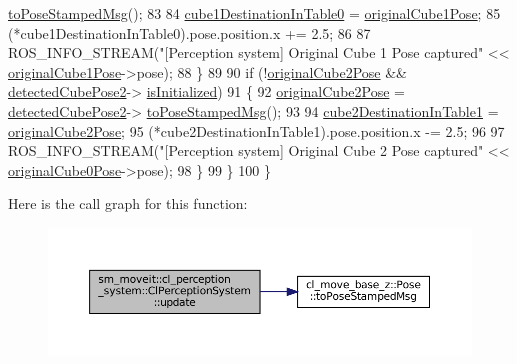 \begin{DoxyCode}
      \hyperlink{classcl__move__base__z_1_1Pose_a63887a88c1ac6e9a4a71b8d7d11aed6c}{toPoseStampedMsg}();
83 
84                 \hyperlink{classsm__moveit_1_1cl__perception__system_1_1ClPerceptionSystem_a13cf34b1fb711829c4ddb9a9e2899ae9}{cube1DestinationInTable0} = 
      \hyperlink{classsm__moveit_1_1cl__perception__system_1_1ClPerceptionSystem_ab8851b53535efa7e154248c119e8c3cd}{originalCube1Pose};
85                 (*cube1DestinationInTable0).pose.position.x += 2.5;
86 
87                 ROS\_INFO\_STREAM(\textcolor{stringliteral}{"[Perception system] Original Cube 1 Pose captured"} << 
      \hyperlink{classsm__moveit_1_1cl__perception__system_1_1ClPerceptionSystem_ab8851b53535efa7e154248c119e8c3cd}{originalCube1Pose}->pose);
88             \}
89 
90             \textcolor{keywordflow}{if} (!\hyperlink{classsm__moveit_1_1cl__perception__system_1_1ClPerceptionSystem_a7d8cdfe20da5b47871adf9d3dce11338}{originalCube2Pose} && \hyperlink{classsm__moveit_1_1cl__perception__system_1_1ClPerceptionSystem_a92801878ea69fb584f459a502bb77dad}{detectedCubePose2}->
      \hyperlink{classcl__move__base__z_1_1Pose_a49df3a978021edb71a48ef5e6d8e75a8}{isInitialized})
91             \{
92                 \hyperlink{classsm__moveit_1_1cl__perception__system_1_1ClPerceptionSystem_a7d8cdfe20da5b47871adf9d3dce11338}{originalCube2Pose} = \hyperlink{classsm__moveit_1_1cl__perception__system_1_1ClPerceptionSystem_a92801878ea69fb584f459a502bb77dad}{detectedCubePose2}->
      \hyperlink{classcl__move__base__z_1_1Pose_a63887a88c1ac6e9a4a71b8d7d11aed6c}{toPoseStampedMsg}();
93 
94                 \hyperlink{classsm__moveit_1_1cl__perception__system_1_1ClPerceptionSystem_abb792620853ba381aa0736b884dabe92}{cube2DestinationInTable1} = 
      \hyperlink{classsm__moveit_1_1cl__perception__system_1_1ClPerceptionSystem_a7d8cdfe20da5b47871adf9d3dce11338}{originalCube2Pose};
95                 (*cube2DestinationInTable1).pose.position.x -= 2.5;
96 
97                 ROS\_INFO\_STREAM(\textcolor{stringliteral}{"[Perception system] Original Cube 2 Pose captured"} << 
      \hyperlink{classsm__moveit_1_1cl__perception__system_1_1ClPerceptionSystem_a763b8723ae96eb30fd21e039e3f52c47}{originalCube0Pose}->pose);
98             \}
99         \}
100     \}
\end{DoxyCode}
Here is the call graph for this function\+:
\nopagebreak
\begin{figure}[H]
\begin{center}
\leavevmode
\includegraphics[width=350pt]{classsm__moveit_1_1cl__perception__system_1_1ClPerceptionSystem_aaefca9001d3836655d38ee92621c013e_cgraph}
\end{center}
\end{figure}


